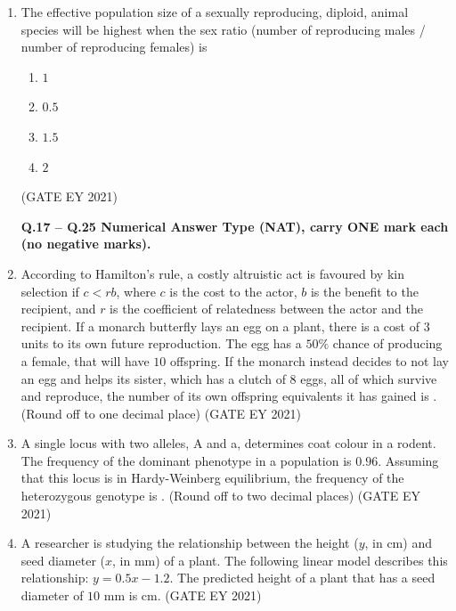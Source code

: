 \documentclass[journal]{IEEEtran}
\begin{document}
\begin{enumerate}
    \item The effective population size of a sexually reproducing, diploid, animal species will be highest when the sex ratio (number of reproducing males / number of reproducing females) is
    \begin{multicols}{4}
    \begin{enumerate}
        \item $1$
        \item $0.5$
        \item $1.5$
        \item $2$
    \end{enumerate}
    \end{multicols}
    \hfill{(GATE EY 2021)}

\textbf{Q.17 -- Q.25 Numerical Answer Type (NAT), carry ONE mark each (no negative marks).}

    \item According to Hamilton's rule, a costly altruistic act is favoured by kin selection if $c < rb$, where $c$ is the cost to the actor, $b$ is the benefit to the recipient, and $r$ is the coefficient of relatedness between the actor and the recipient. If a monarch butterfly lays an egg on a plant, there is a cost of $3$ units to its own future reproduction. The egg has a $50\%$ chance of producing a female, that will have $10$ offspring. If the monarch instead decides to not lay an egg and helps its sister, which has a clutch of $8$ eggs, all of which survive and reproduce, the number of its own offspring equivalents it has gained is \underline{\hspace{3cm}}. (Round off to one decimal place)
    \hfill{(GATE EY 2021)}

    \item A single locus with two alleles, A and a, determines coat colour in a rodent. The frequency of the dominant phenotype in a population is $0.96$. Assuming that this locus is in Hardy-Weinberg equilibrium, the frequency of the heterozygous genotype is \underline{\hspace{3cm}}. (Round off to two decimal places)
    \hfill{(GATE EY 2021)}

    \item A researcher is studying the relationship between the height ($y$, in cm) and seed diameter ($x$, in mm) of a plant. The following linear model describes this relationship: $y = 0.5x - 1.2$. The predicted height of a plant that has a seed diameter of $10$ mm is \underline{\hspace{3cm}} cm.
    \hfill{(GATE EY 2021)}


\end{enumerate}
\end{document}
